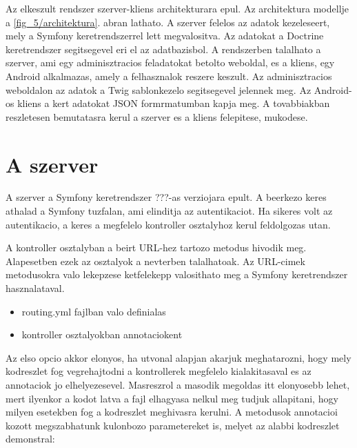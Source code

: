 ﻿Az elkeszult rendszer szerver-kliens architekturara epul.
Az architektura modellje a \ref{fig_5/architektura}. abran lathato. 
A szerver felelos az adatok kezeleseert, mely a Symfony keretrendszerrel lett megvalositva. 
Az adatokat a Doctrine keretrendszer segitsegevel eri el az adatbazisbol. 
A rendszerben talalhato a szerver, ami egy adminisztracios feladatokat betolto weboldal, es a kliens, egy Android alkalmazas, amely a felhasznalok reszere keszult. 
Az adminisztracios weboldalon az adatok a Twig sablonkezelo segitsegevel jelennek meg. 
Az Android-os kliens a kert adatokat JSON formrmatumban kapja meg. 
A tovabbiakban reszletesen bemutatasra kerul a szerver es a kliens felepitese, mukodese. 


\section{A szerver}
\label{szerverfelepites}

A szerver a Symfony keretrendszer ???-as verziojara epult. 
A beerkezo keres athalad a Symfony tuzfalan, ami elinditja az autentikaciot. 
Ha sikeres volt az autentikacio, a keres a megfelelo kontroller osztalyhoz kerul feldolgozas utan. 


A kontroller osztalyban a beirt URL-hez tartozo metodus hivodik meg. 
Alapesetben ezek az osztalyok a  nevterben talalhatoak. 
Az URL-cimek metodusokra valo lekepzese ketfelekepp valosithato meg a Symfony keretrendszer hasznalataval. 

\begin{itemize}
	\item routing.yml fajlban valo definialas
	\item kontroller osztalyokban annotaciokent
\end{itemize}

Az elso opcio akkor elonyos, ha utvonal alapjan akarjuk meghatarozni, hogy mely kodreszlet fog vegrehajtodni a kontrollerek megfelelo kialakitasaval es az annotaciok jo elhelyezesevel. 
Masreszrol a masodik megoldas itt elonyosebb lehet, mert ilyenkor a kodot latva a fajl elhagyasa nelkul meg tudjuk allapitani, hogy milyen esetekben fog a kodreszlet meghivasra kerulni. 
A metodusok annotacioi kozott megszabhatunk kulonbozo parametereket is, melyet az alabbi kodreszlet demonstral:

